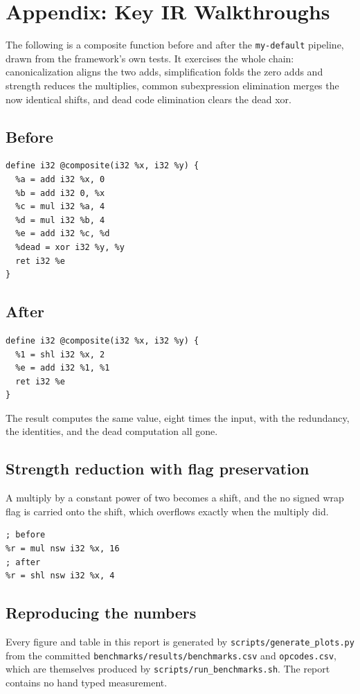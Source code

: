\section{Appendix: Key IR Walkthroughs}

The following is a composite function before and after the \texttt{my-default}
pipeline, drawn from the framework's own tests. It exercises the whole chain:
canonicalization aligns the two adds, simplification folds the zero adds and
strength reduces the multiplies, common subexpression elimination merges the now
identical shifts, and dead code elimination clears the dead xor.

\subsection{Before}

\begin{lstlisting}[style=ir]
define i32 @composite(i32 %x, i32 %y) {
  %a = add i32 %x, 0
  %b = add i32 0, %x
  %c = mul i32 %a, 4
  %d = mul i32 %b, 4
  %e = add i32 %c, %d
  %dead = xor i32 %y, %y
  ret i32 %e
}
\end{lstlisting}

\subsection{After}

\begin{lstlisting}[style=ir]
define i32 @composite(i32 %x, i32 %y) {
  %1 = shl i32 %x, 2
  %e = add i32 %1, %1
  ret i32 %e
}
\end{lstlisting}

The result computes the same value, eight times the input, with the redundancy,
the identities, and the dead computation all gone.

\subsection{Strength reduction with flag preservation}

A multiply by a constant power of two becomes a shift, and the no signed wrap
flag is carried onto the shift, which overflows exactly when the multiply did.

\begin{lstlisting}[style=ir]
; before
%r = mul nsw i32 %x, 16
; after
%r = shl nsw i32 %x, 4
\end{lstlisting}

\subsection{Reproducing the numbers}

Every figure and table in this report is generated by
\texttt{scripts/generate\_plots.py} from the committed
\texttt{benchmarks/results/benchmarks.csv} and \texttt{opcodes.csv}, which are
themselves produced by \texttt{scripts/run\_benchmarks.sh}. The report contains
no hand typed measurement.
